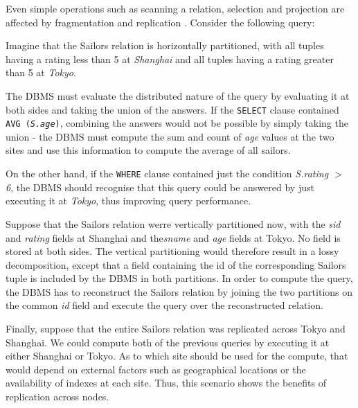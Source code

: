 Even simple operations such as scanning a relation, selection and projection are affected by fragmentation and replication \cite{Ramakrishnan:2002:DMS:560733}. Consider the following query:




Imagine that the Sailors relation is horizontally partitioned, with all tuples having a rating less than 5 at \textit{Shanghai} and all tuples having a rating greater than 5 at \textit{Tokyo}.

The DBMS must evaluate the distributed nature of the query by evaluating it at both sides and taking the union of the answers. If the \texttt{SELECT} clause contained \texttt{AVG (\textit{S.age})}, combining the answers would not be possible by simply taking the union - the DBMS must compute the sum and count of \textit{age} values at the two sites and use this information to compute the average of all sailors. 

On the other hand, if the \texttt{WHERE} clause contained just the condition \textit{S.rating $>$ 6}, the DBMS should recognise that this query could be answered by just executing it at \textit{Tokyo}, thus improving query performance.

Suppose that the Sailors relation werre vertically partitioned now, with the \textit{sid} and \textit{rating} fields at Shanghai and the\textit{sname} and \textit{age} fields at Tokyo. No field is stored at both sides. The vertical partitioning would therefore result in a lossy decomposition, except that a field containing the id of the corresponding Sailors tuple is included by the DBMS in both partitions. In order to compute the query, the DBMS has to reconstruct the Sailors relation by joining the two partitions on the common \textit{id} field and execute the query over the reconstructed relation.

Finally, suppose that the entire Sailors relation was replicated across Tokyo and Shanghai. We could compute both of the previous queries by executing it at either Shanghai or Tokyo. As to which site should be used for the compute, that would depend on external factors such as geographical locations or the availability of indexes at each site. Thus, this scenario shows the benefits of replication across nodes.

